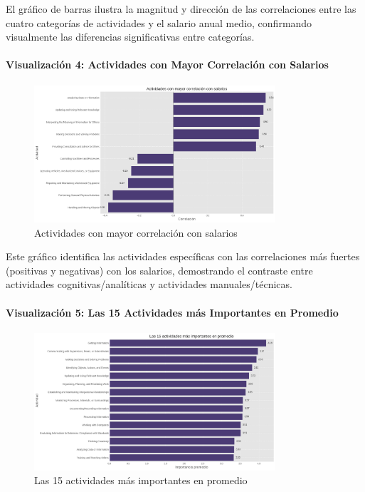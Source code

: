 \documentclass{article}
\theoremstyle{remark}
\theoremstyle{definition}
\begin{document}
\begin{tcolorbox}
El gráfico de barras ilustra la magnitud y dirección de las correlaciones entre las cuatro categorías de actividades y el salario anual medio, confirmando visualmente las diferencias significativas entre categorías.

\paragraph{Visualización 4: Actividades con Mayor Correlación con Salarios}
\begin{figure}[H]
    \centering
    \includegraphics[width=0.8\textwidth]{views/entrega1/actividades_mayor_correlacion}
    \caption{Actividades con mayor correlación con salarios}
    \label{fig:actividades_correlacion}
\end{figure}

Este gráfico identifica las actividades específicas con las correlaciones más fuertes (positivas y negativas) con los salarios, demostrando el contraste entre actividades cognitivas/analíticas y actividades manuales/técnicas.

\paragraph{Visualización 5: Las 15 Actividades más Importantes en Promedio}
\begin{figure}[H]
    \centering
    \includegraphics[width=0.8\textwidth]{views/entrega1/actividades_importantes}
    \caption{Las 15 actividades más importantes en promedio}
    \label{fig:actividades_importantes}
\end{figure}


\end{tcolorbox}
\end{document}
